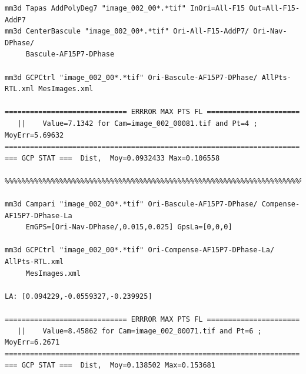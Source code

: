 \begin{verbatim}
mm3d Tapas AddPolyDeg7 "image_002_00*.*tif" InOri=All-F15 Out=All-F15-AddP7
mm3d CenterBascule "image_002_00*.*tif" Ori-All-F15-AddP7/ Ori-Nav-DPhase/ 
     Bascule-AF15P7-DPhase
     
mm3d GCPCtrl "image_002_00*.*tif" Ori-Bascule-AF15P7-DPhase/ AllPts-RTL.xml MesImages.xml

============================= ERRROR MAX PTS FL ======================
   ||    Value=7.1342 for Cam=image_002_00081.tif and Pt=4 ; MoyErr=5.69632
======================================================================
=== GCP STAT ===  Dist,  Moy=0.0932433 Max=0.106558
       
%%%%%%%%%%%%%%%%%%%%%%%%%%%%%%%%%%%%%%%%%%%%%%%%%%%%%%%%%%%%%%%%%%%%%%%%%%%%%%%%%%%%%%%%%

mm3d Campari "image_002_00*.*tif" Ori-Bascule-AF15P7-DPhase/ Compense-AF15P7-DPhase-La 
     EmGPS=[Ori-Nav-DPhase/,0.015,0.025] GpsLa=[0,0,0]
     
mm3d GCPCtrl "image_002_00*.*tif" Ori-Compense-AF15P7-DPhase-La/ AllPts-RTL.xml 
     MesImages.xml

LA: [0.094229,-0.0559327,-0.239925]

============================= ERRROR MAX PTS FL ======================
   ||    Value=8.45862 for Cam=image_002_00071.tif and Pt=6 ; MoyErr=6.2671
======================================================================
=== GCP STAT ===  Dist,  Moy=0.138502 Max=0.153681
\end{verbatim}



